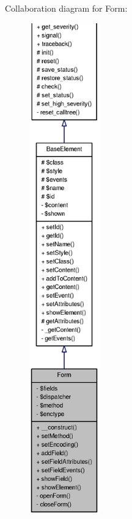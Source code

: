 Collaboration diagram for Form:
\nopagebreak
\begin{figure}[H]
\begin{center}
\leavevmode
\includegraphics[height=600pt]{classForm__coll__graph}
\end{center}
\end{figure}
